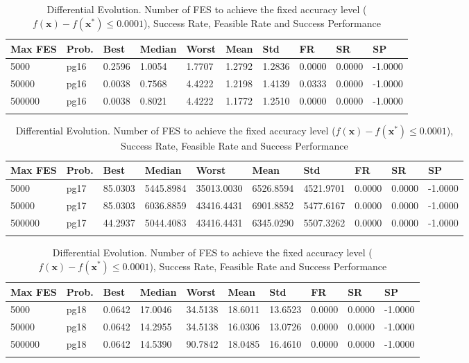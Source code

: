 \documentclass[10pt, a4paper]{book}
\begin{document}
\begin{center}
\begin{longtable}{l l l l l l l l l l}
\textbf{Max FES} & \textbf{Prob.} & \textbf{Best} & \textbf{Median} & \textbf{Worst} & \textbf{Mean} & \textbf{Std} & \textbf{FR} & \textbf{SR} & \textbf{SP} \\
\hline
5000 & pg16 & 0.2596 & 1.0054 & 1.7707 & 1.2792 & 1.2836 & 0.0000 & 0.0000 & -1.0000 \\
50000 & pg16 & 0.0038 & 0.7568 & 4.4222 & 1.2198 & 1.4139 & 0.0333 & 0.0000 & -1.0000 \\
500000 & pg16 & 0.0038 & 0.8021 & 4.4222 & 1.1772 & 1.2510 & 0.0000 & 0.0000 & -1.0000 \\

\caption{ Differential Evolution. Number of FES to achieve the fixed accuracy level ($f(\mathbf{x}) - f(\mathbf{x}^{*}) \leq 0.0001$), Success Rate, Feasible Rate and Success Performance }
\end{longtable}
\end{center}

\begin{center}
\begin{longtable}{l l l l l l l l l l}
\textbf{Max FES} & \textbf{Prob.} & \textbf{Best} & \textbf{Median} & \textbf{Worst} & \textbf{Mean} & \textbf{Std} & \textbf{FR} & \textbf{SR} & \textbf{SP} \\
\hline
5000 & pg17 & 85.0303 & 5445.8984 & 35013.0030 & 6526.8594 & 4521.9701 & 0.0000 & 0.0000 & -1.0000 \\
50000 & pg17 & 85.0303 & 6036.8859 & 43416.4431 & 6901.8852 & 5477.6167 & 0.0000 & 0.0000 & -1.0000 \\
500000 & pg17 & 44.2937 & 5044.4083 & 43416.4431 & 6345.0290 & 5507.3262 & 0.0000 & 0.0000 & -1.0000 \\

\caption{ Differential Evolution. Number of FES to achieve the fixed accuracy level ($f(\mathbf{x}) - f(\mathbf{x}^{*}) \leq 0.0001$), Success Rate, Feasible Rate and Success Performance }
\end{longtable}
\end{center}

\begin{center}
\begin{longtable}{l l l l l l l l l l}
\textbf{Max FES} & \textbf{Prob.} & \textbf{Best} & \textbf{Median} & \textbf{Worst} & \textbf{Mean} & \textbf{Std} & \textbf{FR} & \textbf{SR} & \textbf{SP} \\
\hline
5000 & pg18 & 0.0642 & 17.0046 & 34.5138 & 18.6011 & 13.6523 & 0.0000 & 0.0000 & -1.0000 \\
50000 & pg18 & 0.0642 & 14.2955 & 34.5138 & 16.0306 & 13.0726 & 0.0000 & 0.0000 & -1.0000 \\
500000 & pg18 & 0.0642 & 14.5390 & 90.7842 & 18.0485 & 16.4610 & 0.0000 & 0.0000 & -1.0000 \\

\caption{ Differential Evolution. Number of FES to achieve the fixed accuracy level ($f(\mathbf{x}) - f(\mathbf{x}^{*}) \leq 0.0001$), Success Rate, Feasible Rate and Success Performance }
\end{longtable}
\end{center}
\end{document}
